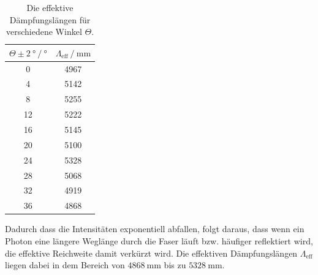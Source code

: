 \begin{table}
    \centering
    \caption{Die effektive Dämpfungslängen für verschiedene Winkel $\Theta$.}
    \label{tab:atten}
    \begin{tabular}{c c}
    \toprule
    {$\Theta \pm \SI{2}{\degree} \mathbin{/} \si{\degree}$} & {$\Lambda_{\text{eff}} \mathbin{/} \si{\milli\meter}$} \\
    \midrule
     0 & 4967 \\
     4 & 5142 \\
     8 & 5255 \\
    12 & 5222 \\
    16 & 5145 \\
    20 & 5100 \\
    24 & 5328 \\
    28 & 5068 \\
    32 & 4919 \\
    36 & 4868 \\
    \bottomrule
  \end{tabular}
\end{table}
Dadurch dass die Intensitäten exponentiell abfallen, folgt daraus, dass wenn ein Photon eine längere Weglänge durch die Faser läuft bzw. häufiger reflektiert wird, die effektive Reichweite damit verkürzt wird.
Die effektiven Dämpfungslängen $\Lambda_{\text{eff}}$ liegen dabei in dem Bereich von $\SI{4868}{\milli\meter}$ bis zu $\SI{5328}{\milli\meter}$.
